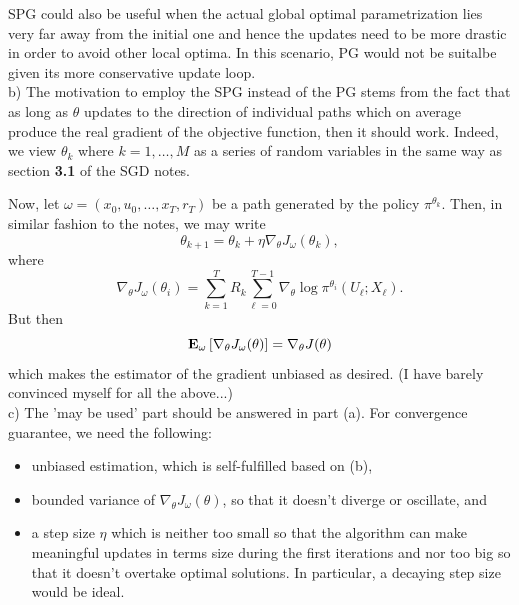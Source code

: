 \documentclass[12pt]{article}
\begin{document}
SPG could also be useful when the actual global optimal parametrization lies very far away from the initial one and hence the updates need to be more drastic in order to avoid other local optima. In this scenario, PG would not be suitalbe given its more conservative update loop. \\

b) The motivation to employ the SPG instead of the PG stems from the fact that as long as \(\theta\) updates to the direction of individual paths which on average produce the real gradient of the objective function, then it should work. Indeed, we view \(\theta_k \) where \(k = 1,\ldots, M \) as a series of random variables in the same way as section \textbf{3.1} of the SGD notes. 

Now, let \(\omega = (x_0, u_0, \ldots, x_T, r_T) \) be a path generated by the policy \(\pi^{\theta_k}\). Then, in similar fashion to the notes, we may write 
\begin{equation*}
    \theta_{k+1} = \theta_k + \eta \nabla_\theta J_\omega (\theta_k ),
\end{equation*}
where 
\begin{equation*}
    \nabla_\theta J_\omega(\theta_i) = \sum_{k=1}^{T }R_k \sum_{\ell = 0 }^{T - 1 } \nabla_\theta \log \pi^{\theta_i} (U_\ell ; X_\ell).
\end{equation*}
But then 
\begin{equation*}
    \vb E_\omega\left[\nabla_\theta J_\omega(\theta)\right] = \nabla_\theta J(\theta)
\end{equation*}
which makes the estimator of the gradient unbiased as desired. 
(I have barely convinced myself for all the above...) \\

c) The 'may be used' part should be answered in part (a). 
For convergence guarantee, we need the following: 
\begin{itemize}
    \item unbiased estimation, which is self-fulfilled based on (b), 
    \item bounded variance of \(\nabla_\theta J_\omega(\theta)\), so that it doesn't diverge or oscillate, and
    \item a step size \(\eta\) which is neither too small so that the algorithm can make meaningful updates in terms size during the first iterations and nor too big so that it doesn't overtake optimal solutions. In particular, a decaying step size would be ideal. 
\end{itemize}
\end{document}
